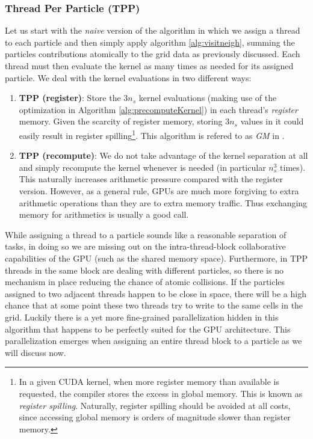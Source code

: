 \documentclass[ twoside,openright,titlepage,numbers=noenddot,%
headinclude,footinclude,cleardoublepage=empty,abstract=on,
BCOR=5mm,paper=a4,fontsize=11pt, dvipsnames
]{scrreprt}
\begin{document}
\subsubsection*{Thread Per Particle (TPP)}
Let us start with the \emph{naive} version of the algorithm in which we assign a thread to each particle and then simply apply algorithm \ref{alg:visitneigh}, summing the particles contributions atomically to the grid data as previously discussed. Each thread must then evaluate the kernel as many times as needed for its assigned particle. We deal with the kernel evaluations in two different ways:
\begin{enumerate}
\item \textbf{TPP (register)}: Store the $3n_s$ kernel evaluations (making use of the optimization in Algorithm \ref{alg:precomputeKernel}) in each thread's \emph{register} memory. Given the scarcity of register memory, storing $3n_s$ values in it could easily result in register spilling\footnote{In a given CUDA kernel, when more register memory than available is requested, the compiler stores the excess in global memory. This is known as \emph{register spilling}. Naturally, register spilling should be avoided at all costs, since accessing global memory is orders of magnitude slower than register memory.}. This algorithm is refered to as \emph{GM} in \cite{Shih2021}.
\item \textbf{TPP (recompute)}: We do not take advantage of the kernel separation at all and simply recompute the kernel whenever is needed (in particular $n_s^3$ times). This naturally increases arithmetic pressure compared with the register version. However, as a general rule, GPUs are much more forgiving to extra arithmetic operations than they are to extra memory traffic. Thus exchanging memory for arithmetics is usually a good call.
\end{enumerate}
While assigning a thread to a particle sounds like a reasonable separation of tasks, in doing so we are missing out on the intra-thread-block collaborative capabilities of the GPU (such as the shared memory space). Furthermore, in TPP threads in the same block are dealing with different particles, so there is no mechanism in place reducing the chance of atomic collisions. If the particles assigned to two adjacent threads happen to be close in space, there will be a high chance that at some point these two threads try to write to the same cells in the grid. Luckily there is a yet more fine-grained parallelization hidden in this algorithm that happens to be perfectly suited for the GPU architecture. This parallelization emerges when assigning an entire thread block to a particle as we will discuss now.
\end{document}
